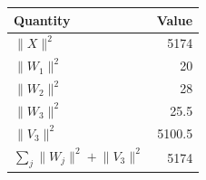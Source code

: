 \begin{tabular}{lr}
\toprule
Quantity & Value \\
\midrule
$\lVert X\rVert^2$ & 5174 \\
$\lVert W_1\rVert^2$ & 20 \\
$\lVert W_2\rVert^2$ & 28 \\
$\lVert W_3\rVert^2$ & 25.5 \\
$\lVert V_3\rVert^2$ & 5100.5 \\
$\sum_j \lVert W_j\rVert^2 + \lVert V_3\rVert^2$ & 5174 \\
\bottomrule
\end{tabular}